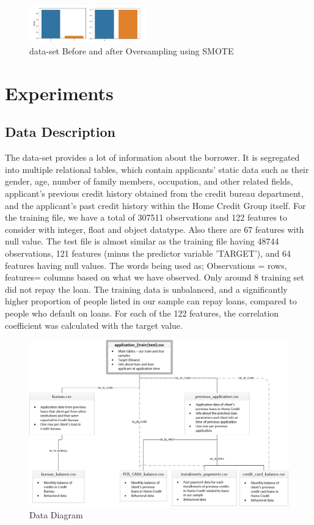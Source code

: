 \documentclass[sigconf, nonacm]{acmart}
\begin{document}
\begin{figure}[t]
	\centering
	\includegraphics[width=0.45\textwidth]{Oversampling/smote.PNG}
	\caption{data-set Before and after Oversampling using SMOTE}
	\label{fig:Oversample}
\end{figure}


\section{Experiments}
\subsection{Data Description}
The data-set provides a lot of information about the borrower. It is segregated into multiple relational tables, which contain applicants’ static data such as their gender, age, number of family members, occupation, and other related fields, applicant’s previous credit history obtained from the credit bureau department, and the applicant’s past credit history within the Home Credit Group itself. 
For the training file, we have a total of 307511 observations and 122 features to consider with integer, float and object datatype. Also there are 67 features with null value. The test file is almost similar as the training file having 48744 observations, 121 features (minus the predictor variable ’TARGET’), and 64 features having null values. The words being used as; Observations = rows, features= columns based on what we have observed. Only around 8 training set did not repay the loan. The training data is unbalanced, and a significantly higher proportion of people listed in our sample can repay loans, compared to people who default on loans. For each of the 122 features, the correlation coefficient was calculated with the target value.


\begin{figure}[t] 
	\centering
	\includegraphics[width=\textwidth]{data/home_credit.png}
	\caption{Data Diagram\cite{Start_Here_:_A_Gentle_Introduction}}
	\label{fig:data_diag}
\end{figure}
\end{document}
